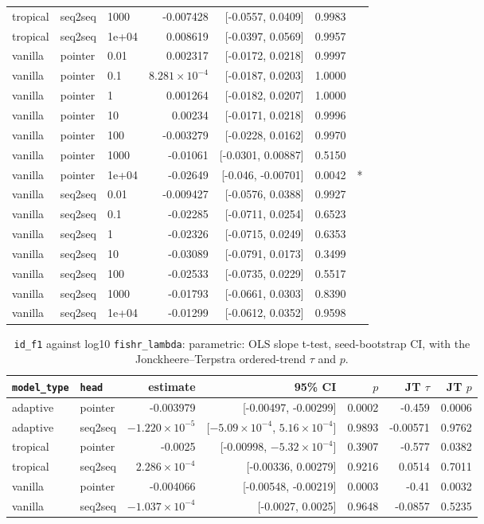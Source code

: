 \documentclass[10pt]{article}
\begin{document}
{\begin{longtable}{lllrrrl}
tropical & seq2seq & 1000 & -0.007428 & [-0.0557, 0.0409] & 0.9983 & \\
tropical & seq2seq & 1e+04 & 0.008619 & [-0.0397, 0.0569] & 0.9957 & \\
vanilla & pointer & 0.01 & 0.002317 & [-0.0172, 0.0218] & 0.9997 & \\
vanilla & pointer & 0.1 & $8.281\times10^{-4}$ & [-0.0187, 0.0203] & 1.0000 & \\
vanilla & pointer & 1 & 0.001264 & [-0.0182, 0.0207] & 1.0000 & \\
vanilla & pointer & 10 & 0.00234 & [-0.0171, 0.0218] & 0.9996 & \\
vanilla & pointer & 100 & -0.003279 & [-0.0228, 0.0162] & 0.9970 & \\
vanilla & pointer & 1000 & -0.01061 & [-0.0301, 0.00887] & 0.5150 & \\
vanilla & pointer & 1e+04 & -0.02649 & [-0.046, -0.00701] & 0.0042 & *\\
vanilla & seq2seq & 0.01 & -0.009427 & [-0.0576, 0.0388] & 0.9927 & \\
vanilla & seq2seq & 0.1 & -0.02285 & [-0.0711, 0.0254] & 0.6523 & \\
vanilla & seq2seq & 1 & -0.02326 & [-0.0715, 0.0249] & 0.6353 & \\
vanilla & seq2seq & 10 & -0.03089 & [-0.0791, 0.0173] & 0.3499 & \\
vanilla & seq2seq & 100 & -0.02533 & [-0.0735, 0.0229] & 0.5517 & \\
vanilla & seq2seq & 1000 & -0.01793 & [-0.0661, 0.0303] & 0.8390 & \\
vanilla & seq2seq & 1e+04 & -0.01299 & [-0.0612, 0.0352] & 0.9598 & \\
\bottomrule
\end{longtable}
}

{\small
\begin{longtable}{llrrrrr}
\caption{\texttt{id\_f1} against log10 \texttt{fishr\_lambda}: parametric: OLS slope t-test, seed-bootstrap CI, with the Jonckheere--Terpstra ordered-trend $\tau$ and $p$.}\label{tab:trend-id_f1}\\
\toprule
\texttt{model\_type} & \texttt{head} & estimate & 95\% CI & $p$ & JT $\tau$ & JT $p$\\
\midrule
\endhead
adaptive & pointer & -0.003979 & [-0.00497, -0.00299] & 0.0002 & -0.459 & 0.0006\\
adaptive & seq2seq & $-1.220\times10^{-5}$ & [$-5.09\times10^{-4}$, $5.16\times10^{-4}$] & 0.9893 & -0.00571 & 0.9762\\
tropical & pointer & -0.0025 & [-0.00998, $-5.32\times10^{-4}$] & 0.3907 & -0.577 & 0.0382\\
tropical & seq2seq & $2.286\times10^{-4}$ & [-0.00336, 0.00279] & 0.9216 & 0.0514 & 0.7011\\
vanilla & pointer & -0.004066 & [-0.00548, -0.00219] & 0.0003 & -0.41 & 0.0032\\
vanilla & seq2seq & $-1.037\times10^{-4}$ & [-0.0027, 0.0025] & 0.9648 & -0.0857 & 0.5235\\
\bottomrule
\end{longtable}
}
\end{document}
